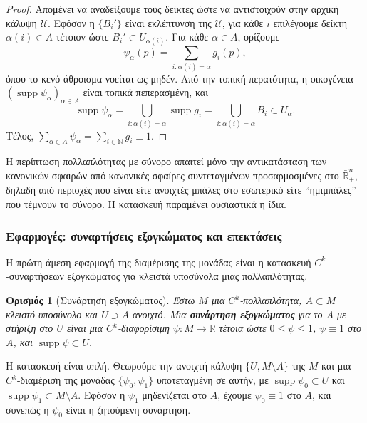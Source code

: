 \documentclass[11pt,a4paper,twoside,openright]{book}
\newtheorem{definition}[lemma]{Ορισμός}
\begin{document}
\begin{proof}
Απομένει να αναδείξουμε τους δείκτες ώστε να αντιστοιχούν στην αρχική κάλυψη $\mathcal{U}$. Εφόσον η $\{B_i'\}$ είναι εκλέπτυνση της $\mathcal{U}$, για κάθε $i$ επιλέγουμε δείκτη $\alpha(i) \in A$ τέτοιον ώστε $B_i' \subset U_{\alpha(i)}$. Για κάθε $\alpha \in A$, ορίζουμε
\begin{equation*}
\psi_\alpha(p) = \sum_{i : \alpha(i) = \alpha} g_i(p),
\end{equation*}
όπου το κενό άθροισμα νοείται ως μηδέν. Από την τοπική περατότητα, η οικογένεια $(\operatorname{supp} \psi_\alpha)_{\alpha \in A}$ είναι τοπικά πεπερασμένη, και
\begin{equation*}
\operatorname{supp} \psi_\alpha
= \bigcup_{i : \alpha(i) = \alpha} \operatorname{supp} g_i
= \bigcup_{i : \alpha(i) = \alpha} \overline{B}_i
\subset U_\alpha.
\end{equation*}
Τέλος, $\sum_{\alpha \in A} \psi_\alpha = \sum_{i \in \mathbb{N}} g_i \equiv 1$.
\end{proof}

\noindent
Η περίπτωση πολλαπλότητας με σύνορο απαιτεί μόνο την αντικατάσταση των κανονικών σφαιρών από κανονικές σφαίρες συντεταγμένων προσαρμοσμένες στο $\bar{\mathbb{R}}^n_+$, δηλαδή από περιοχές που είναι είτε ανοιχτές μπάλες στο εσωτερικό είτε ``ημιμπάλες'' που τέμνουν το σύνορο. Η κατασκευή παραμένει ουσιαστικά η ίδια.

\subsubsection{Εφαρμογές: συναρτήσεις εξογκώματος και επεκτάσεις}
	\label{sec:applications-bump-extensions}

Η πρώτη άμεση εφαρμογή της διαμέρισης της μονάδας είναι η κατασκευή $C^k$-συναρτήσεων εξογκώματος για κλειστά υποσύνολα μιας πολλαπλότητας.

\begin{definition}[Συνάρτηση εξογκώματος]\label{def:bump-function}
Έστω $M$ μια $C^k$-πολλαπλότητα, $A \subset M$ κλειστό υποσύνολο και $U \supset A$ ανοιχτό. Μια \textbf{συνάρτηση εξογκώματος} για το $A$ με στήριξη στο $U$ είναι μια $C^k$-διαφορίσιμη $\psi: M \to \mathbb{R}$ τέτοια ώστε $0 \le \psi \le 1$, $\psi \equiv 1$ στο $A$, και $\operatorname{supp} \psi \subset U$.
\end{definition}

\noindent
Η κατασκευή είναι απλή. Θεωρούμε την ανοιχτή κάλυψη $\{U, M \setminus A\}$ της $M$ και μια $C^k$-διαμέριση της μονάδας $\{\psi_0, \psi_1\}$ υποτεταγμένη σε αυτήν, με $\operatorname{supp} \psi_0 \subset U$ και $\operatorname{supp} \psi_1 \subset M \setminus A$. Εφόσον η $\psi_1$ μηδενίζεται στο $A$, έχουμε $\psi_0 \equiv 1$ στο $A$, και συνεπώς η $\psi_0$ είναι η ζητούμενη συνάρτηση.
\end{document}
